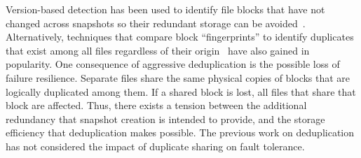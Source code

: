 Version-based detection has been used to identify file blocks that have not
changed across snapshots so their redundant storage can be
avoided~\cite{Clements2009,Vrable2009,TanIPDPS2011}.
Alternatively, techniques that compare block ``fingerprints'' to
identify duplicates
that exist among all files regardless of their 
origin~\cite{Guo2011,Dong2011,extreme_binning09} have
also gained in popularity.  
One consequence of aggressive deduplication is the possible loss of failure
resilience.  Separate files share the same physical copies of blocks that are
logically duplicated among them.  If a shared block is lost, all files that
share that block are affected.  
Thus, there exists a
tension between the additional redundancy that snapshot creation is intended
to provide, and the storage efficiency that deduplication makes possible.
The previous work on deduplication has not considered the impact of 
duplicate sharing on  fault tolerance.

